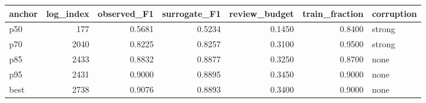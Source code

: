 \begin{tabular}{lrrrrrl}
\toprule
anchor &  log\_index &  observed\_F1 &  surrogate\_F1 &  review\_budget &  train\_fraction & corruption \\
\midrule
   p50 &        177 &       0.5681 &        0.5234 &         0.1450 &          0.8400 &     strong \\
   p70 &       2040 &       0.8225 &        0.8257 &         0.3100 &          0.9500 &     strong \\
   p85 &       2433 &       0.8832 &        0.8877 &         0.3250 &          0.8700 &       none \\
   p95 &       2431 &       0.9000 &        0.8895 &         0.3450 &          0.9000 &       none \\
  best &       2738 &       0.9076 &        0.8893 &         0.3400 &          0.9000 &       none \\
\bottomrule
\end{tabular}
